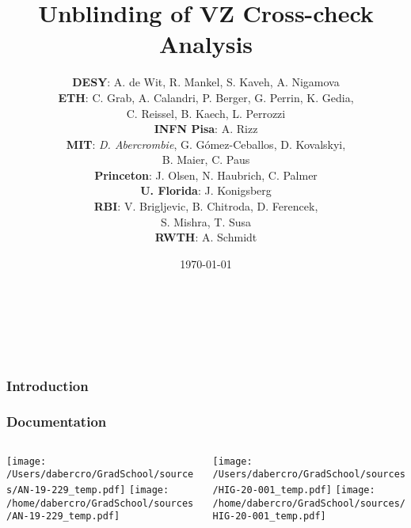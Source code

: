 \documentclass{beamer}
\author[D. Abercrombie]{
  {\bf DESY}: A. de Wit, R. Mankel, S. Kaveh, A. Nigamova \\
  \vfill
  {\bf ETH}: C. Grab, A. Calandri, P. Berger, G. Perrin, K. Gedia, \\
  \qquad \qquad C. Reissel, B. Kaech, L. Perrozzi \\
  \vfill
  {\bf INFN Pisa}: A. Rizz \\
  \vfill
  {\bf MIT}: \emph{D. Abercrombie}, G. G\'omez-Ceballos, D. Kovalskyi, \\
  \qquad \qquad B. Maier, C. Paus \\
  \vfill
  {\bf Princeton}: J. Olsen, N. Haubrich, C. Palmer \\
  \vfill
  {\bf U. Florida}: J. Konigsberg \\
  \vfill
  {\bf RBI}: V. Brigljevic, B. Chitroda, D. Ferencek, \\
  \qquad \qquad S. Mishra, T. Susa \\
  \vfill
  {\bf RWTH}: A. Schmidt \\
}
\title{\bf \sffamily Unblinding of VZ Cross-check Analysis}
\date{\today}
\begin{document}
\begin{frame}
  \begin{center}
  \inserttitle \\
  \end{center}
  \vfill
  \insertauthor \\
  \vfill
  \begin{center}
  \insertdate
  \end{center}
\end{frame}

\begin{frame}
  \frametitle{Introduction}
\end{frame}

\begin{frame}
  \frametitle{Documentation}

  \begin{columns}
    \begin{column}{0.5\linewidth}
      \centering
                   {\texttt{[image: /Users/dabercro/GradSchool/sources/AN-19-229\_temp.pdf]}}
                   {\texttt{[image: /home/dabercro/GradSchool/sources/AN-19-229\_temp.pdf]}}
    \end{column}
    \begin{column}{0.5\linewidth}
      \centering
                   {\texttt{[image: /Users/dabercro/GradSchool/sources/HIG-20-001\_temp.pdf]}}
                   {\texttt{[image: /home/dabercro/GradSchool/sources/HIG-20-001\_temp.pdf]}}
    \end{column}
  \end{columns}

\end{frame}
\end{document}
